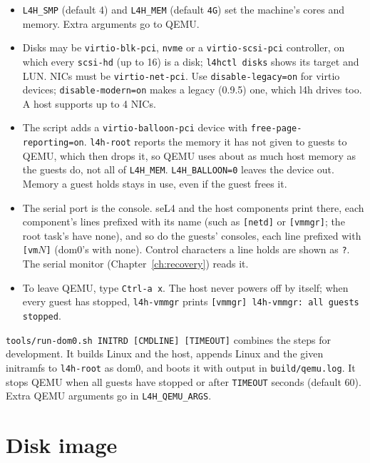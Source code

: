 \documentclass[11pt,a4paper]{report}
\newcommand{\cmd}[1]{\texttt{#1}}
\newcommand{\file}[1]{\texttt{#1}}
\begin{document}
\begin{itemize}
  \item \texttt{L4H\_SMP} (default 4) and \texttt{L4H\_MEM} (default
        \texttt{4G}) set the machine's cores and memory. Extra arguments go
        to QEMU.
  \item Disks may be \texttt{virtio-blk-pci}, \texttt{nvme} or a
        \texttt{virtio-scsi-pci} controller, on which every
        \texttt{scsi-hd} (up to 16) is a disk; \cmd{l4hctl disks} shows
        its target and LUN. NICs must
        be \texttt{virtio-net-pci}. Use \texttt{disable-legacy=on} for
        virtio devices; \texttt{disable-modern=on} makes a legacy (0.9.5)
        one, which l4h drives too. A host supports up to 4 NICs.
  \item The script adds a \texttt{virtio-balloon-pci} device with
        \texttt{free-page-reporting=on}. \texttt{l4h-root} reports the
        memory it has not given to guests to QEMU, which then drops it,
        so QEMU uses about as much host memory as the guests do, not all
        of \texttt{L4H\_MEM}. \texttt{L4H\_BALLOON=0} leaves the device
        out. Memory a guest holds stays in use, even if the guest frees it.
  \item The serial port is the console. seL4 and the host components print
        there, each component's lines prefixed with its name (such as
        \texttt{[netd]} or \texttt{[vmmgr]}; the root task's have none),
        and so do the guests' consoles, each line prefixed with
        \texttt{[vm$N$]} (dom0's with none). Control characters a line
        holds are shown as \texttt{?}. The serial monitor
        (Chapter~\ref{ch:recovery}) reads it.
  \item To leave QEMU, type \texttt{Ctrl-a x}. The host never powers off by
        itself; when every guest has stopped, \texttt{l4h-vmmgr} prints
        \texttt{[vmmgr] l4h-vmmgr: all guests stopped}.
\end{itemize}

\cmd{tools/run-dom0.sh INITRD [CMDLINE] [TIMEOUT]} combines the steps for
development. It builds Linux and the host, appends Linux and the given
initramfs to \texttt{l4h-root} as dom0, and boots it with output in \file{build/qemu.log}. It stops QEMU when
all guests have stopped or after \texttt{TIMEOUT} seconds (default 60).
Extra QEMU arguments go in \texttt{L4H\_QEMU\_ARGS}.

\section{Disk image}
\label{sec:image}
\end{document}
